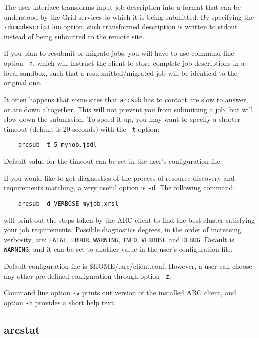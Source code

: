 The user interface transforms input job description into a format
that can be understood by the Grid services to which it is being
submitted. By specifying the \verb#-dumpdescription# option, such transformed
description is written to stdout instead of being submitted to the remote site.



If you plan to resubmit or migrate jobs, you will have to use command line
option \verb#-n#, which will instruct the client to store complete job descriptions
in a local sandbox, such that a resubmitted/migrated job will be identical to the
original one.

It often happens that some sites that \verb#arcsub# has to contact
are slow to answer, or are down altogether. This will not prevent
you from submitting a job, but will slow down the submission. To
speed it up, you may want to specify a shorter timeout (default is
20 seconds) with the \verb#-t# option:
\begin{verbatim}
    arcsub -t 5 myjob.jsdl
\end{verbatim}

Default value for the timeout can be set in the user's configuration file.

If you would like to get diagnostics of the process of resource
discovery and requirements matching, a very useful option is
\verb#-d#. The following command:
\begin{verbatim}
    arcsub -d VERBOSE myjob.xrsl
\end{verbatim}

will print out the steps taken by the ARC client to find the
best cluster satisfying your job requirements. Possible diagnostics degrees, in the
order of increasing verbosity, are: \texttt{FATAL}, \texttt{ERROR}, \texttt{WARNING},
\texttt{INFO}, \texttt{VERBOSE} and \texttt{DEBUG}. Default is \texttt{WARNING}, and
it can be set to another value in the user's configuration file.

Default configuration file is {\$}HOME/.arc/client.conf. However, a user can choose any
other pre-defined configuration through option \verb#-z#.

Command line option \verb#-v# prints out version of the installed ARC client, and option
\verb#-h# provides a short help text.


\subsection{arcstat}
\label{sec:arcstat}

